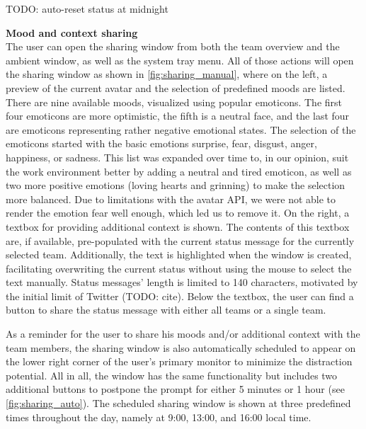 TODO: auto-reset status at midnight

\medskip\noindent\textbf{Mood and context sharing} \\
The user can open the sharing window from both the team overview and the ambient window, as well as the system tray menu. All of those actions will open the sharing window as shown in \autoref{fig:sharing_manual}, where on the left, a preview of the current avatar and the selection of predefined moods are listed. There are nine available moods, visualized using popular emoticons. The first four emoticons are more optimistic, the fifth is a neutral face, and the last four are emoticons representing rather negative emotional states. The selection of the emoticons started with the basic emotions surprise, fear, disgust, anger, happiness, or sadness. This list was expanded over time to, in our opinion, suit the work environment better by adding a neutral and tired emoticon, as well as two more positive emotions (loving hearts and grinning) to make the selection more balanced. Due to limitations with the avatar API, we were not able to render the emotion fear well enough, which led us to remove it. On the right, a textbox for providing additional context is shown. The contents of this textbox are, if available, pre-populated with the current status message for the currently selected team. Additionally, the text is highlighted when the window is created, facilitating overwriting the current status without using the mouse to select the text manually. Status messages' length is limited to 140 characters, motivated by the initial limit of Twitter (TODO: cite). Below the textbox, the user can find a button to share the status message with either all teams or a single team.

As a reminder for the user to share his moods and/or additional context with the team members, the sharing window is also automatically scheduled to appear on the lower right corner of the user's primary monitor to minimize the distraction potential. All in all, the window has the same functionality but includes two additional buttons to postpone the prompt for either 5 minutes or 1 hour (see \autoref{fig:sharing_auto}). The scheduled sharing window is shown at three predefined times throughout the day, namely at 9:00, 13:00, and 16:00 local time.

